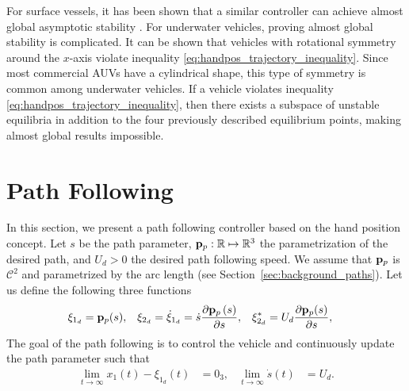 \begin{rmk}
    For surface vessels, it has been shown that a similar controller can achieve almost global asymptotic stability \cite{paliotta_trajectory_2019}.
    For underwater vehicles, proving almost global stability is complicated.
    It can be shown that vehicles with rotational symmetry around the $x$-axis violate inequality \eqref{eq:handpos_trajectory_inequality}.
    Since most commercial AUVs have a cylindrical shape, this type of symmetry is common among underwater vehicles.
    If a vehicle violates inequality \eqref{eq:handpos_trajectory_inequality}, then there exists a subspace of unstable equilibria in addition to the four previously described equilibrium points, making almost global results impossible.
\end{rmk}

\section{Path Following}
\label{sec:handpos_trajectory_path_following}
In this section, we present a path following controller based on the hand position concept.
Let $s$ be the path parameter, $\mathbf{p}_p: \mathbb{R} \mapsto \mathbb{R}^{3}$ the parametrization of the desired path, and $U_d > 0$ the desired path following speed.
We assume that $\mathbf{p}_p$ is $\mathcal{C}^2$ and parametrized by the arc length (see Section~\ref{sec:background_paths}).
Let us define the following three functions
\begin{align}
    \xi_{1_d} &= \mathbf{p}_p(s), &
    \xi_{2_d} &= \dot{\xi}_{1_d} = \dot{s}\frac{\partial \mathbf{p}_p\left(s\right)}{\partial s}, &
    \xi_{2_d}^{*} &= U_d \frac{\partial \mathbf{p}_p(s)}{\partial s},
\end{align}
The goal of the path following is to control the vehicle and continuously update the path parameter such that
\begin{align}
    \lim_{t \rightarrow \infty} x_1(t) - \xi_{1_d}(t) &= 0_3, &
    \lim_{t \rightarrow \infty} \dot{s}(t) &= U_d. \label{eq:handpos_trajectory_control_goal_path}
\end{align}

